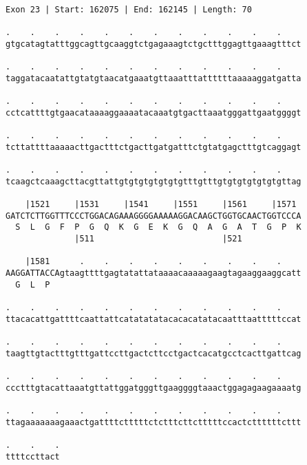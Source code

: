 \documentclass{article}
\begin{document}
\begin{Verbatim}[fontfamily=courier]
Exon 23 | Start: 162075 | End: 162145 | Length: 70

.    .    .    .    .    .    .    .    .    .    .    .    
gtgcatagtatttggcagttgcaaggtctgagaaagtctgctttggagttgaaagtttct

.    .    .    .    .    .    .    .    .    .    .    .    
taggatacaatattgtatgtaacatgaaatgttaaatttattttttaaaaaggatgatta

.    .    .    .    .    .    .    .    .    .    .    .    
cctcattttgtgaacataaaaggaaaatacaaatgtgacttaaatgggattgaatggggt

.    .    .    .    .    .    .    .    .    .    .    .    
tcttattttaaaaacttgactttctgacttgatgatttctgtatgagctttgtcaggagt

.    .    .    .    .    .    .    .    .    .    .    .    
tcaagctcaaagcttacgttattgtgtgtgtgtgtgtttgtttgtgtgtgtgtgtgttag

    |1521     |1531     |1541     |1551     |1561     |1571 
GATCTCTTGGTTTCCCTGGACAGAAAGGGGAAAAAGGACAAGCTGGTGCAACTGGTCCCA
  S  L  G  F  P  G  Q  K  G  E  K  G  Q  A  G  A  T  G  P  K
              |511                          |521            

    |1581      .    .    .    .    .    .    .    .    .    
AAGGATTACCAgtaagttttgagtatattataaaacaaaaagaagtagaaggaaggcatt
  G  L  P                                                   

.    .    .    .    .    .    .    .    .    .    .    .    
ttacacattgattttcaattattcatatatatacacacatatacaatttaatttttccat

.    .    .    .    .    .    .    .    .    .    .    .    
taagttgtactttgtttgattccttgactcttcctgactcacatgcctcacttgattcag

.    .    .    .    .    .    .    .    .    .    .    .    
ccctttgtacattaaatgttattggatgggttgaaggggtaaactggagagaagaaaatg

.    .    .    .    .    .    .    .    .    .    .    .    
ttagaaaaaaagaaactgattttctttttctctttcttctttttccactcttttttcttt

.    .    .
ttttccttact
\end{Verbatim}
\newpage
\end{document}
